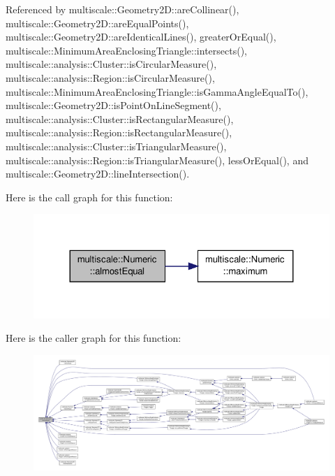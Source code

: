 Referenced by multiscale\-::\-Geometry2\-D\-::are\-Collinear(), multiscale\-::\-Geometry2\-D\-::are\-Equal\-Points(), multiscale\-::\-Geometry2\-D\-::are\-Identical\-Lines(), greater\-Or\-Equal(), multiscale\-::\-Minimum\-Area\-Enclosing\-Triangle\-::intersects(), multiscale\-::analysis\-::\-Cluster\-::is\-Circular\-Measure(), multiscale\-::analysis\-::\-Region\-::is\-Circular\-Measure(), multiscale\-::\-Minimum\-Area\-Enclosing\-Triangle\-::is\-Gamma\-Angle\-Equal\-To(), multiscale\-::\-Geometry2\-D\-::is\-Point\-On\-Line\-Segment(), multiscale\-::analysis\-::\-Cluster\-::is\-Rectangular\-Measure(), multiscale\-::analysis\-::\-Region\-::is\-Rectangular\-Measure(), multiscale\-::analysis\-::\-Cluster\-::is\-Triangular\-Measure(), multiscale\-::analysis\-::\-Region\-::is\-Triangular\-Measure(), less\-Or\-Equal(), and multiscale\-::\-Geometry2\-D\-::line\-Intersection().



Here is the call graph for this function\-:\nopagebreak
\begin{figure}[H]
\begin{center}
\leavevmode
\includegraphics[width=324pt]{classmultiscale_1_1Numeric_a996dda9f7361be59b4614eace0b93f24_cgraph}
\end{center}
\end{figure}




Here is the caller graph for this function\-:\nopagebreak
\begin{figure}[H]
\begin{center}
\leavevmode
\includegraphics[width=350pt]{classmultiscale_1_1Numeric_a996dda9f7361be59b4614eace0b93f24_icgraph}
\end{center}
\end{figure}


